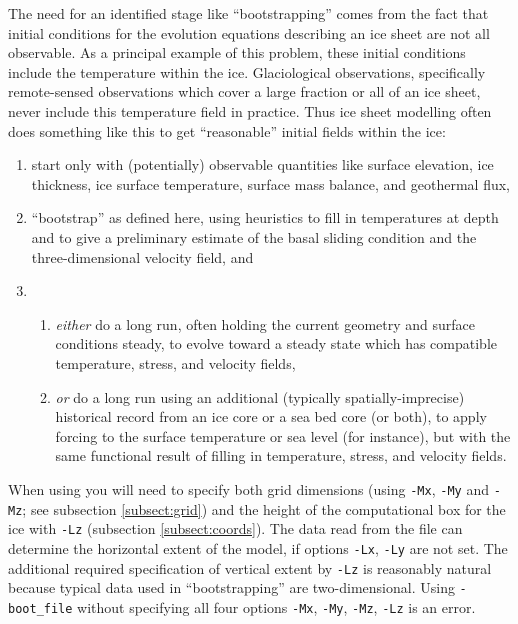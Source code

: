 The need for an identified stage like ``bootstrapping'' comes from the fact that initial conditions for the evolution equations describing an ice sheet are not all observable.  As a principal example of this problem, these initial conditions include the temperature within the ice.  Glaciological observations, specifically remote-sensed observations which cover a large fraction or all of an ice sheet, never include this temperature field in practice.  Thus ice sheet modelling often does something like this to get ``reasonable'' initial fields within the ice:
\begin{enumerate}
\item start only with (potentially) observable quantities like surface elevation, ice thickness, ice surface temperature, surface mass balance, and geothermal flux,
\item ``bootstrap'' as defined here, using heuristics to fill in temperatures at depth and to give a preliminary estimate of the basal sliding condition and the three-dimensional velocity field, and
\item \begin{enumerate}
      \item \emph{either} do a long run, often holding the current geometry and surface conditions steady, to evolve toward a steady state which has compatible temperature, stress, and velocity fields,
      \item \emph{or} do a long run using an additional (typically spatially-imprecise) historical record from an ice core or a sea bed core (or both), to apply forcing to the surface temperature or sea level (for instance), but with the same functional result of filling in temperature, stress, and velocity fields.
      \end{enumerate}
\end{enumerate}

When using  you will need to specify both grid dimensions (using \texttt{-Mx}, \texttt{-My} and \texttt{-Mz}; see subsection \ref{subsect:grid}) and the height of the computational box for the ice with \texttt{-Lz} (subsection \ref{subsect:coords}).  The data read from the file can determine the horizontal extent of the model, if options \texttt{-Lx}, \texttt{-Ly} are not set.  The additional required specification of vertical extent by \texttt{-Lz} is reasonably natural because typical data used in ``bootstrapping'' are two-dimensional.  Using \texttt{-boot_file} without specifying all four options \texttt{-Mx}, \texttt{-My}, \texttt{-Mz}, \texttt{-Lz} is an error.


